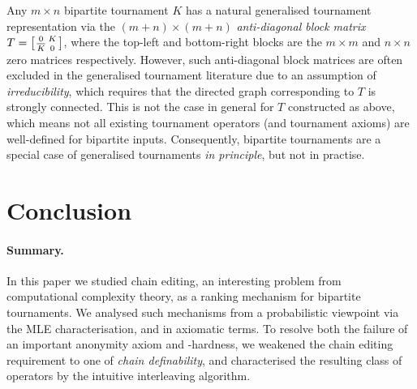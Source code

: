 Any $m \times n$ bipartite tournament $K$ has a natural generalised tournament
representation via the $(m + n) \times (m + n)$ \emph{anti-diagonal block
matrix}
$
    T = \left[\begin{smallmatrix}
        0 & K \\
        {\overline{K}} & 0
    \end{smallmatrix}\right]
$, where the top-left and bottom-right blocks are the $m \times m$ and $n
\times n$ zero matrices respectively.  However, such anti-diagonal block
matrices are often excluded in the generalised tournament literature due to an
assumption of \emph{irreducibility}, which requires that the directed graph
corresponding to $T$ is strongly connected. This is not the case in general for
$T$ constructed as above, which means not all existing tournament
operators (and tournament axioms) are well-defined for bipartite
inputs.\footnotemark{} Consequently, bipartite tournaments are a special case
of generalised tournaments \emph{in principle}, but not in practise.


\section{Conclusion}
\label{tourn_sec_conclusion}

\paragraph{Summary.}
%
In this paper we studied chain editing, an interesting problem from
computational complexity theory, as a ranking mechanism for bipartite
tournaments. We analysed such mechanisms from a probabilistic viewpoint via the
MLE characterisation, and in axiomatic terms. To resolve both the failure of an
important anonymity axiom and -hardness, we weakened the
chain editing requirement to one of \emph{chain definability}, and
characterised the resulting class of operators by the intuitive interleaving
algorithm.

